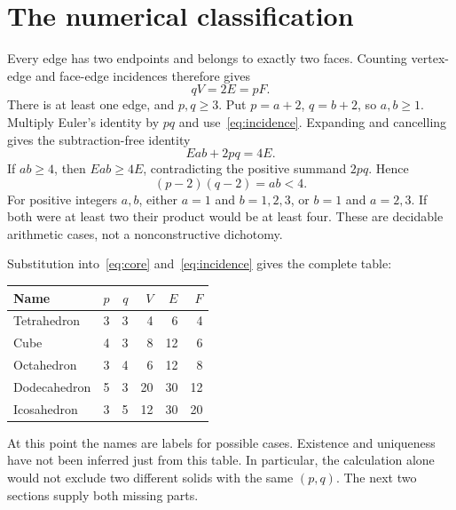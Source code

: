 \section{The numerical classification}\label{sec:numerical}

Every edge has two endpoints and belongs to exactly two faces. Counting
vertex-edge and face-edge incidences therefore gives
\begin{equation}\label{eq:incidence}
 qV=2E=pF.
\end{equation}
There is at least one edge, and $p,q\geq3$. Put
$p=a+2$, $q=b+2$, so $a,b\geq1$. Multiply Euler's identity by $pq$
and use~\eqref{eq:incidence}. Expanding and cancelling gives the
subtraction-free identity
\begin{equation}\label{eq:core}
 Eab+2pq=4E.
\end{equation}
If $ab\geq4$, then $Eab\geq4E$, contradicting the positive summand
$2pq$. Hence
\begin{equation}\label{eq:small}
 (p-2)(q-2)=ab<4.
\end{equation}
For positive integers $a,b$, either $a=1$ and $b=1,2,3$, or
$b=1$ and $a=2,3$. If both were at least two their product would be
at least four. These are decidable arithmetic cases, not a
nonconstructive dichotomy.

Substitution into~\eqref{eq:core} and~\eqref{eq:incidence} gives the
complete table:
\begin{center}
\begin{tabular}{lrrrrr}
\toprule
Name & $p$ & $q$ & $V$ & $E$ & $F$\\
\midrule
Tetrahedron & 3 & 3 & 4 & 6 & 4\\
Cube & 4 & 3 & 8 & 12 & 6\\
Octahedron & 3 & 4 & 6 & 12 & 8\\
Dodecahedron & 5 & 3 & 20 & 30 & 12\\
Icosahedron & 3 & 5 & 12 & 30 & 20\\
\bottomrule
\end{tabular}
\end{center}
At this point the names are labels for possible cases. Existence and
uniqueness have not been inferred just from this table. In particular,
the calculation alone would not exclude two different solids with the
same $(p,q)$. The next two sections supply both missing parts.
